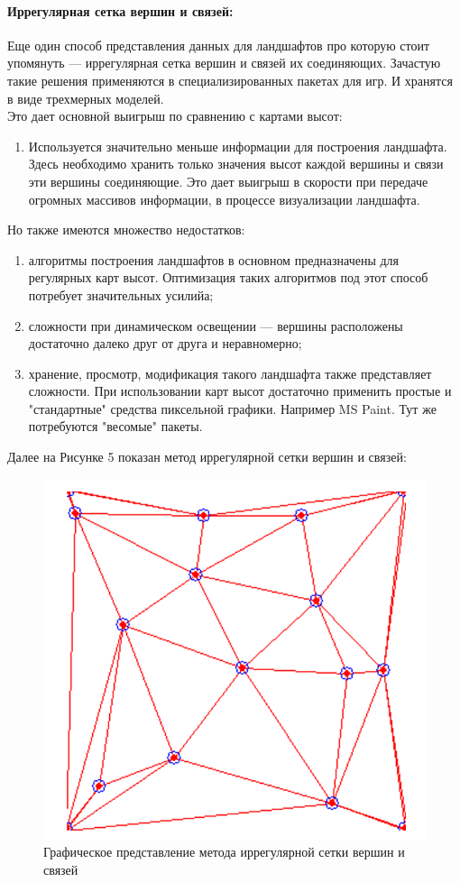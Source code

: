 \documentclass[a4paper, 10pt]{article}
\begin{document}
	\paragraph{Иррегулярная сетка вершин и связей:}
	Еще один способ представления данных для ландшафтов про которую стоит упомянуть — иррегулярная сетка вершин и связей их соединяющих. Зачастую такие решения применяются в специализированных пакетах для игр. И хранятся в виде трехмерных моделей.
	\\ Это дает основной выигрыш по сравнению с картами высот:
	 \begin{enumerate}
	 	\item Используется значительно меньше информации для построения ландшафта. Здесь необходимо хранить только значения высот каждой вершины и связи эти вершины соединяющие. Это дает выигрыш в скорости при передаче огромных массивов информации, в процессе визуализации ландшафта.
	 \end{enumerate}
 	Но также имеются множество недостатков:
 	\begin{enumerate}
 		\item алгоритмы построения ландшафтов в основном предназначены для регулярных карт высот. Оптимизация таких алгоритмов под этот способ потребует значительных усилийа;
 		\item сложности при динамическом освещении — вершины расположены достаточно далеко друг от друга и неравномерно;
 		\item хранение, просмотр, модификация такого ландшафта также представляет сложности. При использовании карт высот достаточно применить простые и "стандартные" средства пиксельной графики. Например MS Paint. Тут же потребуются "весомые" пакеты.
 	\end{enumerate}
	Далее на Рисунке 5 показан метод иррегулярной сетки вершин и связей:
	\begin{figure}[h!]
		\centering
		\includegraphics[scale=0.7]{irregular}
		\centering\caption{Графическое представление метода иррегулярной сетки вершин и связей}
	\end{figure}
\end{document}
